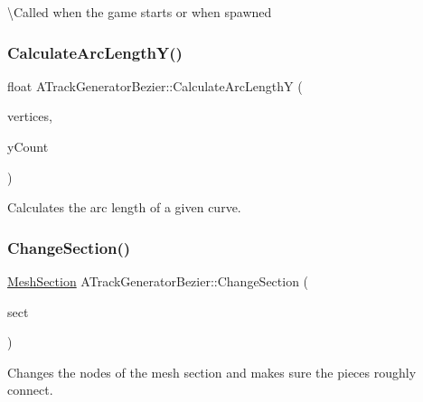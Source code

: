 \textbackslash{}\+Called when the game starts or when spawned \mbox{\label{class_a_track_generator_bezier_a8f525f68b49a3f4feffdb2982af838ea}} 
\subsubsection{\texorpdfstring{CalculateArcLengthY()}{CalculateArcLengthY()}}
{\footnotesize\ttfamily float A\+Track\+Generator\+Bezier\+::\+Calculate\+Arc\+LengthY (\begin{DoxyParamCaption}\item[{T\+Array$<$ F\+Vector $>$ \&}]{vertices,  }\item[{int \&}]{y\+Count }\end{DoxyParamCaption})}



Calculates the arc length of a given curve. 

\mbox{\label{class_a_track_generator_bezier_a7e0d9a91c85f202a673a2d6ec995613b}} 
\subsubsection{\texorpdfstring{ChangeSection()}{ChangeSection()}}
{\footnotesize\ttfamily \mbox{\hyperlink{class_mesh_section}{Mesh\+Section}} A\+Track\+Generator\+Bezier\+::\+Change\+Section (\begin{DoxyParamCaption}\item[{\mbox{\hyperlink{class_mesh_section}{Mesh\+Section}}}]{sect }\end{DoxyParamCaption})}



Changes the nodes of the mesh section and makes sure the pieces roughly connect. 

\mbox{\label{class_a_track_generator_bezier_add24d98642fb9bf3565bfc1f9ca59b97}} 
